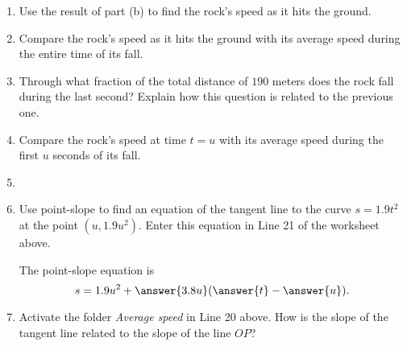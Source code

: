 \documentclass{ximera}
\begin{document}
\begin{exploration}
\begin{enumerate}
\begin{enumerate}
\item Use the result of part (b) to find the rock's speed as it hits the ground.

\item Compare the rock's speed as it hits the ground with its average speed during the entire time of its fall.

\item Through what fraction of the total distance of $190$ meters does the rock fall during the last second? Explain how this question is related to the previous one.

\item Compare the rock's speed at time $t=u$ with its average speed during the first $u$ seconds of its fall.

\item 

\item Use point-slope to find an equation of the tangent line to the curve $s=1.9t^2$ at the point $(u,1.9u^2)$. Enter this equation in Line 21 of the worksheet above.

The point-slope equation is
\[
     s = 1.9u^2 + \answer{3.8u} ( \answer{t} - \answer{u}) .
\]

\item Activate the folder \emph{Average speed} in Line 20 above. How is the slope of the tangent line related to the slope of the line $OP$?


\end{enumerate}


\end{enumerate}


\end{exploration}
\end{document}
